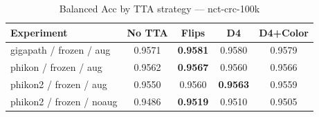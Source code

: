 \begin{table}[ht]
\centering
\caption{Balanced Acc by TTA strategy — nct-crc-100k}
\begin{tabular}{lcccc}
\toprule
  Experiment & No TTA & Flips & D4 & D4+Color \\
\midrule
  gigapath / frozen / aug & 0.9571 & \textbf{0.9581} & 0.9580 & 0.9579 \\
  phikon / frozen / aug & 0.9562 & \textbf{0.9567} & 0.9560 & 0.9566 \\
  phikon2 / frozen / aug & 0.9550 & 0.9560 & \textbf{0.9563} & 0.9559 \\
  phikon2 / frozen / noaug & 0.9486 & \textbf{0.9519} & 0.9510 & 0.9505 \\
\bottomrule
\end{tabular}
\end{table}
